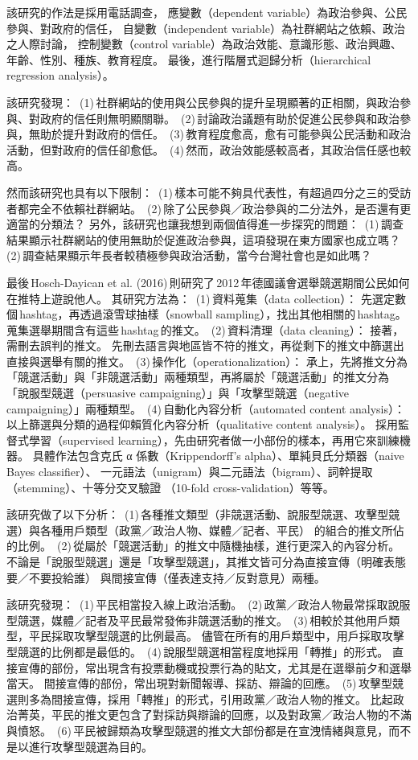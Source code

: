 \documentclass[letterpaper, 10pt, conference]{ieeeconf}   %
\begin{document}
\begin{CJK}{UTF8}{bsmi}
該研究的作法是採用電話調查，
應變數（dependent variable）為政治參與、公民參與、對政府的信任，
自變數（independent variable）為社群網站之依賴、政治之人際討論，
控制變數（control variable）為政治效能、意識形態、政治興趣、年齡、性別、種族、教育程度。
最後，進行階層式迴歸分析（hierarchical regression analysis）。

該研究發現：
\,(1)\,社群網站的使用與公民參與的提升呈現顯著的正相關，與政治參與、對政府的信任則無明顯關聯。
\,(2)\,討論政治議題有助於促進公民參與和政治參與，無助於提升對政府的信任。
\,(3)\,教育程度愈高，愈有可能參與公民活動和政治活動，但對政府的信任卻愈低。
\,(4)\,然而，政治效能感較高者，其政治信任感也較高。

然而該研究也具有以下限制：
\,(1)\,樣本可能不夠具代表性，有超過四分之三的受訪者都完全不依賴社群網站。
\,(2)\,除了公民參與／政治參與的二分法外，是否還有更適當的分類法？
另外，該研究也讓我想到兩個值得進一步探究的問題：
\,(1)\,調查結果顯示社群網站的使用無助於促進政治參與，這項發現在東方國家也成立嗎？
\,(2)\,調查結果顯示年長者較積極參與政治活動，當今台灣社會也是如此嗎？

最後\,Hosch-Dayican et al. (2016)\,則研究了\,2012\,年德國議會選舉競選期間公民如何在推特上遊說他人。\cite{c3}
其研究方法為：
\,(1)\,資料蒐集（data collection）：
先選定數個\,hashtag，再透過滾雪球抽樣（snowball sampling），找出其他相關的\,hashtag。
蒐集選舉期間含有這些\,hashtag\,的推文。
\,(2)\,資料清理（data cleaning）：
接著，需刪去誤判的推文。
先刪去語言與地區皆不符的推文，再從剩下的推文中篩選出直接與選舉有關的推文。
\,(3)\,操作化（operationalization）：
承上，先將推文分為「競選活動」與「非競選活動」兩種類型，再將屬於「競選活動」的推文分為
「說服型競選（persuasive campaigning）」與「攻擊型競選（negative campaigning）」兩種類型。
\,(4)\,自動化內容分析（automated content analysis）：
以上篩選與分類的過程仰賴質化內容分析（qualitative content analysis）。
採用監督式學習（supervised learning），先由研究者做一小部份的樣本，再用它來訓練機器。
具體作法包含克氏 α 係數（Krippendorff's alpha）、單純貝氏分類器（naive Bayes classifier）、
一元語法（unigram）與二元語法（bigram）、詞幹提取（stemming）、十等分交叉驗證
（10-fold cross-validation）等等。

該研究做了以下分析：
\,(1)\,各種推文類型（非競選活動、說服型競選、攻擊型競選）與各種用戶類型（政黨／政治人物、媒體／記者、平民）
的組合的推文所佔的比例。
\,(2)\,從屬於「競選活動」的推文中隨機抽樣，進行更深入的內容分析。
不論是「說服型競選」還是「攻擊型競選」，其推文皆可分為直接宣傳（明確表態要／不要投給誰）
與間接宣傳（僅表達支持／反對意見）兩種。

該研究發現：
\,(1)\,平民相當投入線上政治活動。
\,(2)\,政黨／政治人物最常採取說服型競選，媒體／記者及平民最常發佈非競選活動的推文。
\,(3)\,相較於其他用戶類型，平民採取攻擊型競選的比例最高。
儘管在所有的用戶類型中，用戶採取攻擊型競選的比例都是最低的。
\,(4)\,說服型競選相當程度地採用「轉推」的形式。
直接宣傳的部份，常出現含有投票動機或投票行為的貼文，尤其是在選舉前夕和選舉當天。
間接宣傳的部份，常出現對新聞報導、採訪、辯論的回應。
\,(5)\,攻擊型競選則多為間接宣傳，採用「轉推」的形式，引用政黨／政治人物的推文。
比起政治菁英，平民的推文更包含了對採訪與辯論的回應，以及對政黨／政治人物的不滿與憤怒。
\,(6)\,平民被歸類為攻擊型競選的推文大部份都是在宣洩情緒與意見，而不是以進行攻擊型競選為目的。


\end{CJK}
\end{document}
